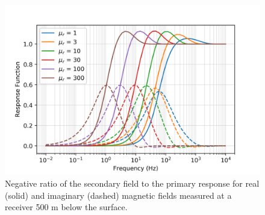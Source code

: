 \begin{figure}
    \begin{center}
    \includegraphics[width=0.6\columnwidth]{figures/casing_software/augustin_response_function_mu.png}
    \end{center}
\caption{Negative ratio of the secondary field to the primary response for real (solid) and imaginary (dashed) magnetic fields measured at a receiver 500 m below the surface.}
\label{fig:augustin_response_function_mu}
\end{figure}
